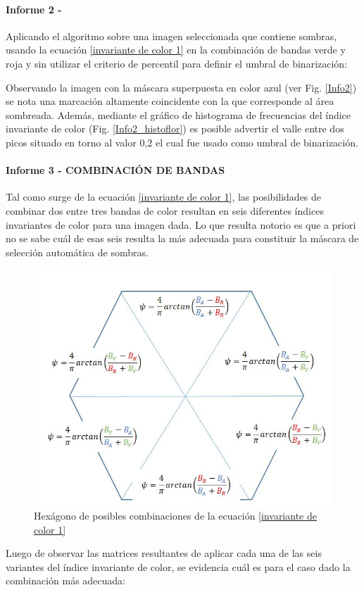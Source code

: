 \paragraph{Informe 2 - }
Aplicando el algoritmo sobre una imagen seleccionada que contiene sombras, usando la ecuación \ref{invariante de color 1} en la combinación de bandas verde y roja y sin utilizar el criterio de percentil para definir el umbral de binarización:

Observando la imagen con la máscara superpuesta en color azul (ver Fig. \ref{Info2}) se nota una marcación altamente coincidente con la que corresponde al área sombreada. Además, mediante el gráfico de histograma de frecuencias del índice invariante de color (Fig. \ref{Info2_histoflor}) es posible advertir el valle entre dos picos situado en torno al valor 0,2 el cual fue usado como umbral de binarización.

 

\paragraph{Informe 3 - COMBINACIÓN DE BANDAS}

Tal como surge de la ecuación \ref{invariante de color 1}, las posibilidades de combinar dos entre tres bandas de color resultan en seis diferentes índices invariantes de color para una imagen dada. Lo que resulta notorio es que a priori no se sabe cuál de esas seis resulta la más adecuada para constituir la máscara de selección automática de sombras. 

\begin{figure}[H]
    \centering
    \includegraphics[width=0.5\linewidth]{Imagenes//Comparativo Homo-IIC/hexagono.JPG}
    \caption{Hexágono de posibles combinaciones de la ecuación \ref{invariante de color 1}}
    \label{hexagono}
\end{figure}

Luego de observar las matrices resultantes de aplicar cada una de las seis variantes del índice invariante de color, se evidencia cuál es para el caso dado la combinación más adecuada:

